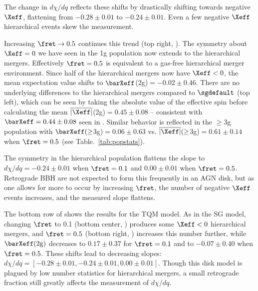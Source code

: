 The change in $d\chi/dq$ reflects these shifts by drastically shifting towards negative $\Xeff$, flattening from $-0.28\pm0.01$ to $-0.24\pm0.01$.
Even a few negative $\Xeff$ hierarchical events skew the measurement.

Increasing $\fret \rightarrow 0.5$ continues this trend (top right, ).
The symmetry about $\Xeff=0$ we have seen in the 1g population now extends to the hierarchical mergers.
Effectively $\fret=0.5$ is equivalent to a gas-free hierarchical merger environment.
Since half of the hierarchical mergers now have $\Xeff<0$, the mean expectation value shifts to $\barXeff$(2g)$=-0.02\pm0.46$.
There are no underlying differences to the hierarchical mergers compared to $\sgdefault$ (top left), which can be seen by taking the absolute value of the effective spin before calculating the mean $\overline{|\Xeff|}$(2g)$=0.45\pm0.08$ -- consistent with $\barXeff=0.44\pm0.08$ seen in \sgdefault.
Similar behavior is reflected in the $\geq$3g population with $\barXeff(\geq$3g)$=0.06\pm0.63$ vs.
$\overline{|\Xeff|}(\geq$3g)$=0.61\pm0.14$ when $\fret=0.5$ (see Table.~\ref{tab:popstats}).

The symmetry in the hierarchical population flattens the slope to $d\chi/dq=-0.24\pm0.01$ when $\fret=0.1$ and $0.00\pm0.01$ when $\fret=0.5$.
Retrograde BBH are not expected to form this frequently in an AGN disk, but as one allows for more to occur by increasing $\fret$, the number of negative $\Xeff$ events increases, and the measured slope flattens.

The bottom row of  shows the results for the TQM model.
As in the SG model, changing $\fret$ to 0.1 (bottom center, ) produces some $\Xeff<0$ hierarchical mergers, and $\fret=0.5$ (bottom right, ) increases this number further, while $\barXeff({\rm 2g})$ decreases to $0.17\pm0.37$ for $\fret=0.1$ and to $-0.07\pm0.40$ when $\fret=0.5$.
These shifts lead to decreasing slopes: $d\chi/dq=[-0.28\pm0.01, -0.24\pm0.01, 0.00\pm0.01]$.
Though this disk model is plagued by low number statistics for hierarchical mergers, a small retrograde fraction still greatly affects the measurement of $d\chi/dq$.

